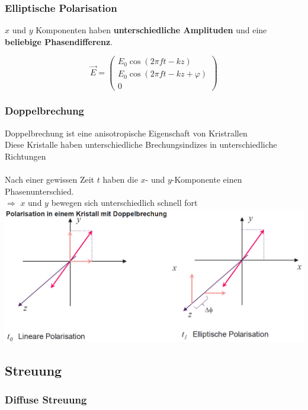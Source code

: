 \subsubsection{Elliptische Polarisation}

$x$ und $y$ Komponenten haben \textbf{unterschiedliche Amplituden} und eine \textbf{beliebige Phasendifferenz}.

$$ \boxed{  \vec{E} = \begin{pmatrix} E_0 \cos(2 \pi ft-kz) \\ E_0 \cos(2 \pi ft -kz + \varphi) \\ 0 \end{pmatrix}  } $$





\subsubsection{Doppelbrechung}

Doppelbrechung ist eine anisotropische Eigenschaft von Kristrallen \\
Diese Kristalle haben unterschiedliche Brechungsindizes in unterschiedliche Richtungen \\
\\
Nach einer gewissen Zeit $t$ haben die $x$- und $y$-Komponente einen Phasenunterschied. \\
$\Rightarrow$ $x$ und $y$ bewegen sich unterschiedlich schnell fort \\

\includegraphics[width=0.8\linewidth]{Bilder/Wellen-Optik/kristall_mit_doppelbrechung}






\subsection{Streuung}

\subsubsection{Diffuse Streuung}

